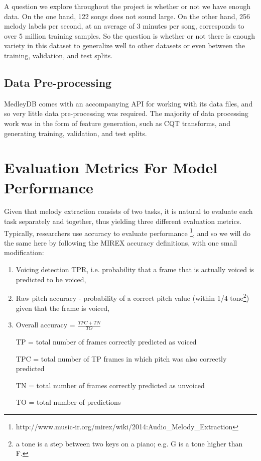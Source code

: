 \documentclass{article} %
\begin{document}
A question we explore throughout the project is whether or not we have enough data.  On the one hand, 122 songs does not sound large.  On the other hand, 256 melody labels per second, at an average of 3 minutes per song, corresponds to over 5 million training samples.  So the question is whether or not there is enough variety in this dataset to generalize well to other datasets or even between the training, validation, and test splits.

\subsection{Data Pre-processing}

MedleyDB comes with an accompanying API for working with its data files, and so very little data pre-processing was required.  The majority of data processing work was in the form of feature generation, such as CQT transforms, and generating training, validation, and test splits.

\section{Evaluation Metrics For Model Performance}
Given that melody extraction consists of two tasks, it is natural to evaluate each task separately and together, thus yielding three different evaluation metrics.  Typically, researchers use accuracy to evaluate performance \footnote{http://www.music-ir.org/mirex/wiki/2014:Audio\_Melody\_Extraction}, and so we will do the same here by following the MIREX accuracy definitions, with one small modification:

\begin{enumerate}
\item Voicing detection TPR, i.e. probability that a frame that is actually voiced is predicted to be voiced,
\item Raw pitch accuracy - probability of a correct pitch value (within 1/4 tone\footnote{a tone is a step between two keys on a piano; e.g. G is a tone higher than F.}) given that the frame is voiced,
\item Overall accuracy = $\frac{TPC+TN}{TO}$


TP = total number of frames correctly predicted as voiced

TPC = total number of TP frames in which pitch was also correctly predicted

TN = total number of frames correctly predicted as unvoiced

TO = total number of predictions

\end{enumerate}
\end{document}

